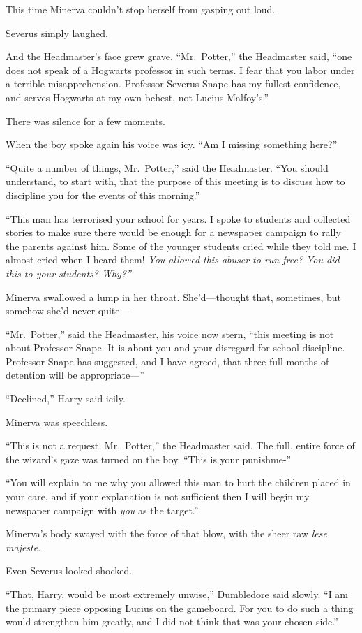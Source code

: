 This time Minerva couldn't stop herself from gasping out loud.

Severus simply laughed.

And the Headmaster's face grew grave. ``Mr.~Potter,'' the Headmaster
said, ``one does not speak of a Hogwarts professor in such terms. I fear
that you labor under a terrible misapprehension. Professor Severus Snape
has my fullest confidence, and serves Hogwarts at my own behest, not
Lucius Malfoy's.''

There was silence for a few moments.

When the boy spoke again his voice was icy. ``Am I missing something
here?''

``Quite a number of things, Mr.~Potter,'' said the Headmaster. ``You
should understand, to start with, that the purpose of this meeting is to
discuss how to discipline you for the events of this morning.''

``This man has terrorised your school for years. I spoke to students and
collected stories to make sure there would be enough for a newspaper
campaign to rally the parents against him. Some of the younger students
cried while they told me. I almost cried when I heard them! \emph{You
allowed this abuser to run free? You did this to your students? Why?''}

Minerva swallowed a lump in her throat. She'd---thought that, sometimes,
but somehow she'd never quite---

``Mr.~Potter,'' said the Headmaster, his voice now stern, ``this meeting
is not about Professor Snape. It is about you and your disregard for
school discipline. Professor Snape has suggested, and I have agreed,
that three full months of detention will be appropriate---''

``Declined,'' Harry said icily.

Minerva was speechless.

``This is not a request, Mr.~Potter,'' the Headmaster said. The full,
entire force of the wizard's gaze was turned on the boy. ``This is your
punishme-''

``You will explain to me why you allowed this man to hurt the children
placed in your care, and if your explanation is not sufficient then I
will begin my newspaper campaign with \emph{you} as the target.''

Minerva's body swayed with the force of that blow, with the sheer raw
\emph{lese majeste}.

Even Severus looked shocked.

``That, Harry, would be most extremely unwise,'' Dumbledore said slowly.
``I am the primary piece opposing Lucius on the gameboard. For you to do
such a thing would strengthen him greatly, and I did not think that was
your chosen side.''

